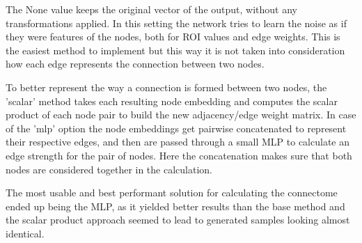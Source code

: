 	The None value keeps the original vector of the output, without any transformations applied. In this setting the network tries to learn the noise as if they were features of the nodes, both for ROI values and edge weights. This is the easiest method to implement but this way it is not taken into consideration how each edge represents the connection between two nodes.
	
	To better represent the way a connection is formed between two nodes, the ’scalar’ method takes each resulting node embedding and computes the scalar product of each node pair to build the new adjacency/edge weight matrix. In case of the ’mlp’ option the node embeddings get pairwise concatenated to represent their respective edges, and then are passed through a small MLP to calculate an edge strength for the pair of nodes. Here the concatenation makes sure that both nodes are considered together in the calculation.
	
	
	The most usable and best performant solution for calculating the connectome ended up being the MLP, as it yielded better results than the base method and the scalar product approach seemed to lead to generated samples looking almost identical.
	
